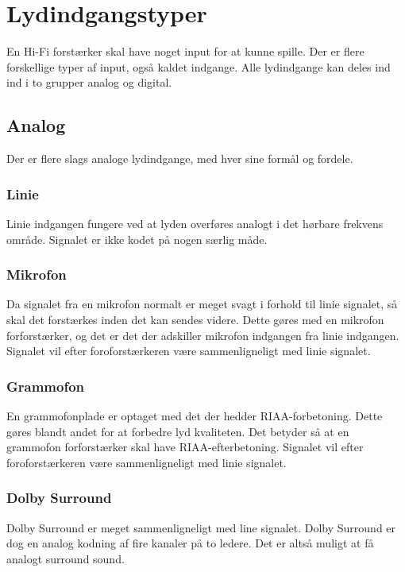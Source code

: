 \section{Lydindgangstyper}
\label{indgange}
En Hi-Fi forstærker skal have noget input for at kunne spille. Der er flere forskellige typer af input, også kaldet indgange. Alle lydindgange kan deles ind ind i to grupper analog og digital.

\subsection{Analog}
Der er flere slags analoge lydindgange, med hver sine formål og fordele.

\subsubsection{Linie}
Linie indgangen fungere ved at lyden overføres analogt i det hørbare frekvens område. Signalet er ikke kodet på nogen særlig måde. 

\subsubsection{Mikrofon}
Da signalet fra en mikrofon normalt er meget svagt i forhold til linie signalet, så skal det forstærkes inden det kan sendes videre. Dette gøres med en mikrofon forforstærker, og det er det der adskiller mikrofon indgangen fra linie indgangen. Signalet vil efter foroforstærkeren være sammenligneligt med linie signalet.

\subsubsection{Grammofon}
En grammofonplade er optaget med det der hedder RIAA-forbetoning. Dette gøres blandt andet for at forbedre lyd kvaliteten. Det betyder så at en grammofon forforstærker skal have RIAA-efterbetoning. Signalet vil efter foroforstærkeren være sammenligneligt med linie signalet. 

\subsubsection{Dolby Surround}
Dolby Surround er meget sammenligneligt med line signalet. Dolby Surround er dog en analog kodning af fire kanaler på to ledere. Det er altså muligt at få analogt surround sound. 

